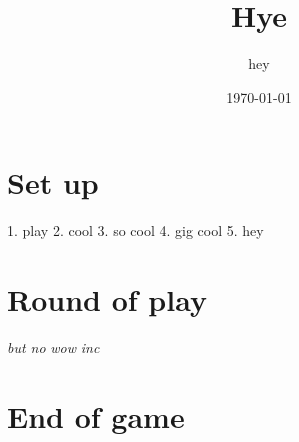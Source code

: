 \documentclass{article}%
\title{Hye}%
\author{hey}%
\date{\today}%
\begin{document}
%
\pagestyle{empty}%
\normalsize%
\maketitle%
\section{ Set up
}%
\label{sec:Setup}%
1. play
%
2. cool
%
3. so cool
%
4. gig cool
%
5. hey


%
\section{ Round of play
}%
\label{sec:Roundofplay}%
\textit{ but no
}%
\textit{ wow
}%
\textit{ inc
}

%
\section{ End of game}%
\label{sec:Endofgame}%

%
\end{document}
